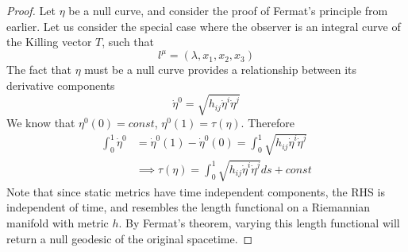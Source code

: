 \begin{proof}
Let $\eta$ be a null curve, and consider the proof of Fermat's principle from earlier. Let us consider the special case where the observer is an integral curve of the Killing vector $T$, such that
\begin{equation}\label{}
l^{\mu} = (\lambda, x_1, x_2, x_3)
\end{equation}
The fact that $\eta$ must be a null curve provides a relationship between its derivative components
\begin{equation}\label{}
\dot{\eta}^0 = \sqrt{h_{ij} \dot{\eta}^i \dot{\eta}^j}
\end{equation}
We know that $\eta^0(0) = const$, $\eta^0(1) = \tau(\eta)$. Therefore
\begin{align*}
\int_0^1 \dot{\eta}^0 &= \dot{\eta}^0(1) - \dot{\eta}^0(0) = \int_0^1 \sqrt{h_{ij} \dot{\eta}^i \dot{\eta}^j} \\
&\implies \tau(\eta) = \int_0^1 \sqrt{h_{ij} \dot{\eta}^i \dot{\eta}^j} ds + const
\end{align*}
Note that since static metrics have time independent components, the RHS is independent of time, and resembles the length functional on a Riemannian manifold with metric $h$. By Fermat's theorem, varying this length functional will return a null geodesic of the original spacetime.
\end{proof}

